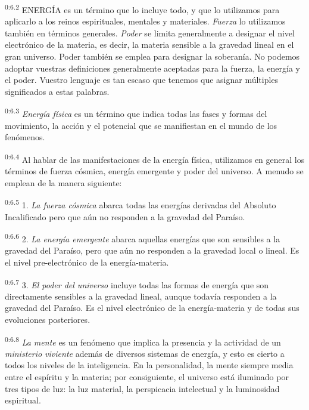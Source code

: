 \par
\textsuperscript{0:6.2} ENERGÍA es un término que lo incluye todo, y que lo utilizamos para aplicarlo a los reinos espirituales, mentales y materiales. \textit{Fuerza} lo utilizamos también en términos generales. \textit{Poder} se limita generalmente a designar el nivel electrónico de la materia, es decir, la materia sensible a la gravedad lineal en el gran universo. Poder también se emplea para designar la soberanía. No podemos adoptar vuestras definiciones generalmente aceptadas para la fuerza, la energía y el poder. Vuestro lenguaje es tan escaso que tenemos que asignar múltiples significados a estas palabras.

\par
\textsuperscript{0:6.3} \textit{Energía física} es un término que indica todas las fases y formas del movimiento, la acción y el potencial que se manifiestan en el mundo de los fenómenos.

\par
\textsuperscript{0:6.4} Al hablar de las manifestaciones de la energía física, utilizamos en general los términos de fuerza cósmica, energía emergente y poder del universo. A menudo se emplean de la manera siguiente:

\par
\textsuperscript{0:6.5} 1. \textit{La fuerza cósmica} abarca todas las energías derivadas del Absoluto Incalificado pero que aún no responden a la gravedad del Paraíso.

\par
\textsuperscript{0:6.6} 2. \textit{La energía emergente} abarca aquellas energías que son sensibles a la gravedad del Paraíso, pero que aún no responden a la gravedad local o lineal. Es el nivel pre-electrónico de la energía-materia.

\par
\textsuperscript{0:6.7} 3. \textit{El poder del universo} incluye todas las formas de energía que son directamente sensibles a la gravedad lineal, aunque todavía responden a la gravedad del Paraíso. Es el nivel electrónico de la energía-materia y de todas sus evoluciones posteriores.

\par
\textsuperscript{0:6.8} \textit{La mente} es un fenómeno que implica la presencia y la actividad de un \textit{ministerio viviente} además de diversos sistemas de energía, y esto es cierto a todos los niveles de la inteligencia. En la personalidad, la mente siempre media entre el espíritu y la materia; por consiguiente, el universo está iluminado por tres tipos de luz: la luz material, la perspicacia intelectual y la luminosidad espiritual.

